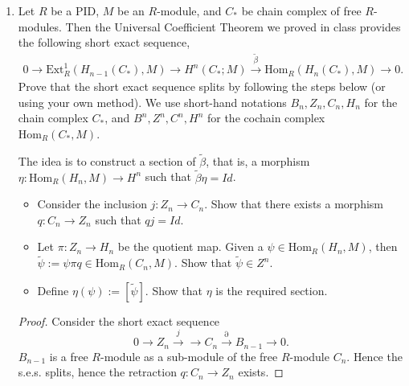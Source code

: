 \begin{enumerate}
\begin{itemize}
\item (No work needed here.) Repeat the procedure in Step 1 for the following exact diagram, and it then completes the construction of the required projective resolution of $N$ at level 1. Inductively, the same procedure works at any level.
\begin{equation*}
        \begin{tikzcd}
        & F_1' \arrow[d]     &  & F_1'' \arrow[d] &  \\
        0 \arrow[r] & \ker \epsilon'\arrow[d]  \arrow[r, "i"] &  \ker \epsilon \arrow[r, "\pi"] & \ker \epsilon''\arrow[d]  \arrow[r] & 0\\
                    & 0                 &                 & 0             &  \\
        \end{tikzcd}
\end{equation*}
\end{itemize}


\item Let $R$ be a PID, $M$ be an $R$-module, and $C_{*}$ be chain complex of free $R$-modules. Then the Universal Coefficient Theorem we proved in class provides the following short exact sequence,
\begin{align*}
    0 \to \text{Ext}_R^1 (H_{n-1}(C_*),M) \to H^n(C_*; M) \overset{\tilde{\beta}}{\to} \text{Hom}_R(H_n(C_*), M) \to 0.
\end{align*}
Prove that the short exact sequence splits by following the steps below (or using your own method). We use short-hand notations $B_n, Z_n, C_n, H_n$ for the chain complex $C_*$, and $B^n, Z^n, C^n,  H^n$ for the cochain complex $\text{Hom}_R(C_*, M)$.

The idea is to construct a section of $\tilde{\beta}$, that is, a morphism $\eta: \text{Hom}_R(H_n, M) \to H^n$ such that $\tilde{\beta}\eta = Id$.
\begin{itemize}
    \item Consider the inclusion $j: Z_n \to C_n$.  Show that there exists a morphism $q: C_n \to Z_n$ such that $q j = Id$.
    \item Let $\pi: Z_n \to H_n$ be the quotient map. Given a $\psi \in \text{Hom}_R(H_n, M)$, then $\tilde{\psi}:=\psi \pi q \in \text{Hom}_R(C_n, M)$. Show that $\tilde{\psi} \in Z^n$.
    \item Define $\eta(\psi):= [\tilde{\psi}]$. Show that $\eta$ is the required section.
\end{itemize}
\begin{proof}
	Consider the short exact sequence
	\[
		0 \to Z_n \xrightarrow{j} \to C_n \xrightarrow{\partial} B_{n - 1} \to 0
	.\] 
	$B_{n - 1}$ is a free $R$-module as a sub-module of the free $R$-module $C_n$. Hence the s.e.s. splits, hence the retraction $q: C_n \to Z_n$ exists.


\end{proof}
\end{enumerate}
